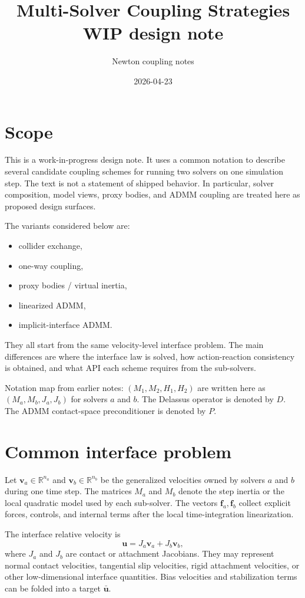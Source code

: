 \documentclass[11pt]{article}
\title{Multi-Solver Coupling Strategies \\
       \large WIP design note}
\author{Newton coupling notes}
\date{2026-04-23}
\newcommand{\va}{\bm v_a}
\newcommand{\vb}{\bm v_b}
\newcommand{\uu}{\bm u}
\newcommand{\ubar}{\bar{\bm u}}
\newcommand{\fa}{\bm f_a}
\newcommand{\fb}{\bm f_b}
\newcommand{\Ja}{J_a}
\newcommand{\Jb}{J_b}
\newcommand{\Ma}{M_a}
\newcommand{\Mb}{M_b}
\newcommand{\Dop}{D}
\newcommand{\Pmat}{P}
\begin{document}
\maketitle

\section{Scope}

This is a work-in-progress design note. It uses a common notation to describe several
candidate coupling schemes for running two solvers on one simulation step. The text is
not a statement of shipped behavior. In particular, solver composition, model views,
proxy bodies, and ADMM coupling are treated here as proposed design surfaces.

The variants considered below are:
\begin{itemize}
\item collider exchange,
\item one-way coupling,
\item proxy bodies / virtual inertia,
\item linearized ADMM,
\item implicit-interface ADMM.
\end{itemize}
They all start from the same velocity-level interface problem. The main differences
are where the interface law is solved, how action-reaction consistency is obtained, and
what API each scheme requires from the sub-solvers.

Notation map from earlier notes: $(M_1,M_2,H_1,H_2)$ are written here as
$(\Ma,\Mb,\Ja,\Jb)$ for solvers $a$ and $b$. The Delassus operator is denoted by
$\Dop$. The ADMM contact-space preconditioner is denoted by $\Pmat$.

\section{Common interface problem}

Let $\va\in\mathbb R^{n_a}$ and $\vb\in\mathbb R^{n_b}$ be the generalized velocities
owned by solvers $a$ and $b$ during one time step. The matrices $\Ma$ and $\Mb$ denote
the step inertia or the local quadratic model used by each sub-solver. The vectors
$\fa,\fb$ collect explicit forces, controls, and internal terms after the local
time-integration linearization.

The interface relative velocity is
\begin{equation}
    \uu = \Ja\va + \Jb\vb,
    \label{eq:relative-velocity}
\end{equation}
where $\Ja$ and $\Jb$ are contact or attachment Jacobians. They may represent normal
contact velocities, tangential slip velocities, rigid attachment velocities, or other
low-dimensional interface quantities. Bias velocities and stabilization terms can be
folded into a target $\ubar$.
\end{document}
